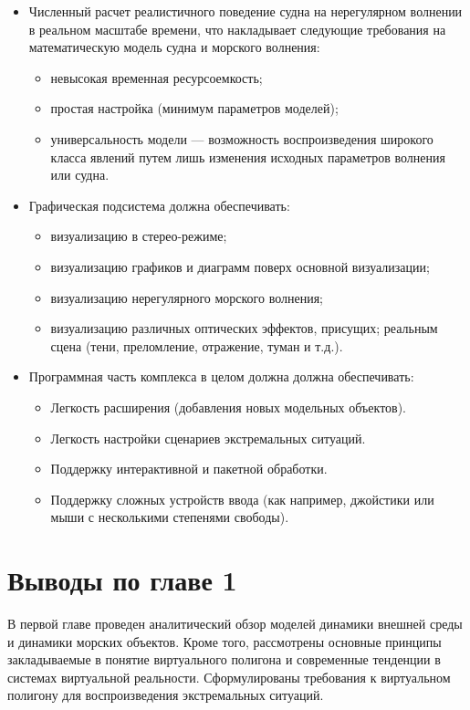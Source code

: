 \begin{itemize}

	\item	Численный расчет реалистичного поведение судна на нерегулярном волнении 
			в реальном масштабе времени, 
			что накладывает следующие требования на математическую модель судна и морского волнения:
			\begin{itemize}
				\item	невысокая временная ресурсоемкость;
				\item	простая настройка (минимум  параметров моделей);
				\item	универсальность модели --- возможность воспроизведения 
						широкого класса явлений путем лишь изменения исходных 
						параметров волнения или судна.
			\end{itemize}
	
	\item	Графическая подсистема должна обеспечивать:
			\begin{itemize}
				\item	визуализацию в стерео-режиме;
				\item	визуализацию графиков и диаграмм поверх основной визуализации;
				\item	визуализацию нерегулярного морского волнения;
				\item	визуализацию различных оптических эффектов, присущих;
						реальным сцена (тени, преломление, отражение, туман и т.д.).
			\end{itemize}
			
	\item	Программная часть комплекса в целом должна должна обеспечивать:
			\begin{itemize}
				\item 	Легкость расширения (добавления новых модельных объектов).
				\item 	Легкость настройки сценариев экстремальных ситуаций.
				\item 	Поддержку интерактивной и пакетной обработки.
				\item	Поддержку сложных устройств ввода 
						(как например, джойстики или  мыши с 
						несколькими степенями свободы).
			\end{itemize}
\end{itemize}



\section{Выводы по главе 1}

В первой главе проведен аналитический обзор моделей динамики внешней среды и динамики морских объектов. 
Кроме того, рассмотрены основные принципы закладываемые в понятие виртуального полигона и современные тенденции в системах виртуальной реальности.
Сформулированы требования к виртуальном полигону для воспроизведения экстремальных ситуаций.









